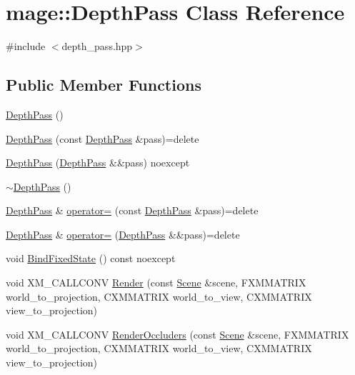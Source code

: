 \hypertarget{classmage_1_1_depth_pass}{}\section{mage\+:\+:Depth\+Pass Class Reference}
\label{classmage_1_1_depth_pass}


{\ttfamily \#include $<$depth\+\_\+pass.\+hpp$>$}

\subsection*{Public Member Functions}
\begin{DoxyCompactItemize}
\item 
\hyperlink{classmage_1_1_depth_pass_a16a23f6820a11faf9195b307474e355b}{Depth\+Pass} ()
\item 
\hyperlink{classmage_1_1_depth_pass_a81dfc5bd3e75b19252168313633e678f}{Depth\+Pass} (const \hyperlink{classmage_1_1_depth_pass}{Depth\+Pass} \&pass)=delete
\item 
\hyperlink{classmage_1_1_depth_pass_a3565dc305ec3c71f369187d12c258b15}{Depth\+Pass} (\hyperlink{classmage_1_1_depth_pass}{Depth\+Pass} \&\&pass) noexcept
\item 
\hyperlink{classmage_1_1_depth_pass_adc89d5da94b42294316d4ad1dfa09eb4}{$\sim$\+Depth\+Pass} ()
\item 
\hyperlink{classmage_1_1_depth_pass}{Depth\+Pass} \& \hyperlink{classmage_1_1_depth_pass_aaa7e32c7850e992658398b59ab588a6b}{operator=} (const \hyperlink{classmage_1_1_depth_pass}{Depth\+Pass} \&pass)=delete
\item 
\hyperlink{classmage_1_1_depth_pass}{Depth\+Pass} \& \hyperlink{classmage_1_1_depth_pass_a1ad4b122b6755e8f3c0073c92ddb29c1}{operator=} (\hyperlink{classmage_1_1_depth_pass}{Depth\+Pass} \&\&pass)=delete
\item 
void \hyperlink{classmage_1_1_depth_pass_a9fb46d9ce430864284bb35091855f7ed}{Bind\+Fixed\+State} () const noexcept
\item 
void X\+M\+\_\+\+C\+A\+L\+L\+C\+O\+NV \hyperlink{classmage_1_1_depth_pass_ae3786fa48a3828c8cf5d5bb9a6c33b87}{Render} (const \hyperlink{classmage_1_1_scene}{Scene} \&scene, F\+X\+M\+M\+A\+T\+R\+IX world\+\_\+to\+\_\+projection, C\+X\+M\+M\+A\+T\+R\+IX world\+\_\+to\+\_\+view, C\+X\+M\+M\+A\+T\+R\+IX view\+\_\+to\+\_\+projection)
\item 
void X\+M\+\_\+\+C\+A\+L\+L\+C\+O\+NV \hyperlink{classmage_1_1_depth_pass_ab44669e2a2190a4c1116594604a84458}{Render\+Occluders} (const \hyperlink{classmage_1_1_scene}{Scene} \&scene, F\+X\+M\+M\+A\+T\+R\+IX world\+\_\+to\+\_\+projection, C\+X\+M\+M\+A\+T\+R\+IX world\+\_\+to\+\_\+view, C\+X\+M\+M\+A\+T\+R\+IX view\+\_\+to\+\_\+projection)
\end{DoxyCompactItemize}

